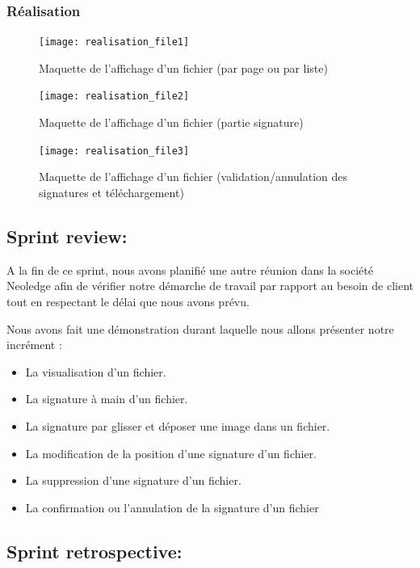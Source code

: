 \subsubsection{Réalisation}

\begin{figure}[H]
  \centering
  \texttt{[image: realisation\_file1]}
  \caption{Maquette de l'affichage d'un fichier (par page ou par liste)}
  \label{fig:realisation_file_1}
\end{figure}
\begin{figure}[H]
  \centering
  \texttt{[image: realisation\_file2]}
  \caption{Maquette de l'affichage d'un fichier (partie signature)}
  \label{fig:realisation_file_2}
\end{figure}
\begin{figure}[H]
  \centering
  \texttt{[image: realisation\_file3]}
  \caption{Maquette de l'affichage d'un fichier (validation/annulation des signatures et téléchargement)}
  \label{fig:realisation_file_3}
\end{figure}

\subsection{Sprint review:}


A la fin de ce sprint, nous avons planifié une autre réunion dans la société Neoledge  afin de vérifier notre démarche de travail par rapport au besoin de client tout en respectant le délai que nous avons prévu.

Nous avons fait une démonstration durant laquelle nous allons présenter notre incrément :
\begin{itemize}
  \item La visualisation d'un fichier.
  \item La signature à main d'un fichier.
  \item La signature par glisser et déposer une image dans un fichier.
  \item La modification de la position d'une signature d'un fichier.
  \item La suppression d'une signature d'un fichier.
  \item La confirmation ou l'annulation de la signature d'un fichier
\end{itemize}

\subsection{Sprint retrospective:}

